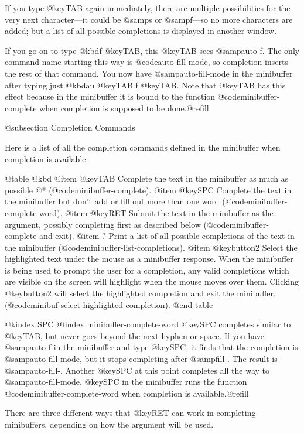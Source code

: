 {{  If you type @key{TAB} again immediately, there are multiple possibilities
for the very next character---it could be @samp{s} or @samp{f}---so no more
characters are added; but a list of all possible completions is displayed
in another window.

  If you go on to type @kbd{f @key{TAB}}, this @key{TAB} sees
@samp{auto-f}.  The only command name starting this way is
@code{auto-fill-mode}, so completion inserts the rest of that command.  You
now have @samp{auto-fill-mode} in the minibuffer after typing just @kbd{au
@key{TAB} f @key{TAB}}.  Note that @key{TAB} has this effect because in the
minibuffer it is bound to the function @code{minibuffer-complete} when
completion is supposed to be done.@refill

@subsection Completion Commands

  Here is a list of all the completion commands defined in the minibuffer
when completion is available.

@table @kbd
@item @key{TAB}
Complete the text in the minibuffer as much as possible @*
(@code{minibuffer-complete}).
@item @key{SPC}
Complete the text in the minibuffer but don't add or fill out more
than one word (@code{minibuffer-complete-word}).
@item @key{RET}
Submit the text in the minibuffer as the argument, possibly completing
first as described below (@code{minibuffer-complete-and-exit}).
@item ?
Print a list of all possible completions of the text in the minibuffer
(@code{minibuffer-list-completions}).
@item @key{button2}
Select the highlighted text under the mouse as a minibuffer response.
When the minibuffer is being used to prompt the user for a completion,
any valid completions which are visible on the screen will highlight
when the mouse moves over them.  Clicking @key{button2} will select the
highlighted completion and exit the minibuffer.  
(@code{minibuf-select-highlighted-completion}).
@end table

@kindex SPC
@findex minibuffer-complete-word
@key{SPC} completes similar to @key{TAB}, but never goes beyond the
next hyphen or space.  If you have @samp{auto-f} in the minibuffer and type
@key{SPC}, it finds that the completion is @samp{auto-fill-mode}, but it
stops completing after @samp{fill-}. The result is @samp{auto-fill-}.
Another @key{SPC} at this point completes all the way to
@samp{auto-fill-mode}.  @key{SPC} in the minibuffer runs the function
@code{minibuffer-complete-word} when completion is available.@refill

  There are three different ways that @key{RET} can work in completing
minibuffers, depending on how the argument will be used.

}}
